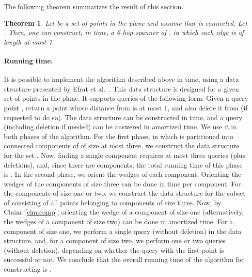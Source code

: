\documentclass[11pt]{article}
\newtheorem{theorem}{Theorem}[section]
\newcommand{\old}[1]{{{}}}
\begin{document}
The following theorem summarizes the result of this section. \begin{theorem}
\label{thm:hop-spanner}
Let  be a set of points in the plane and assume that  is connected. Let . Then, one can construct, in  time, a 6-hop-spanner of , in which each edge is of length at most 7.
\end{theorem}


\paragraph{Running time.}
It is possible to implement the algorithm described above in  time, using a data structure presented by Efrat et al.~\cite{EIK01}. This data structure is designed for a given set  of  points in the plane. It supports queries of the following form: Given a query point , return a point  whose distance from  is at most 1, and also delete it from  (if requested to do so). The data structure can be constructed in  time, and a query (including deletion if needed) can be answered in amortized  time. We use it in both phases of the algorithm. For the first phase, in which  is partitioned into connected components of  of size at most three, we construct the data structure for the set . Now, finding a single component requires at most three queries (plus deletions), and, since there are  components, the total running time of this phase is . In the second phase, we orient the wedges of each component. Orienting the wedges of the components of size three can be done in  time per component. For the components of size one or two, we construct the data structure for the subset of  consisting of all points belonging to components of size three. Now, by Claim~\ref{clm:comp}, orienting the wedge of a component of size one (alternatively, the wedges of a component of size two) can be done in amortized  time. For a component of size one, we perform a single query (without deletion) in the data structure, and, for a component of size two, we perform one or two queries (without deletion), depending on whether the query with the first point is successful or not.  
We conclude that the overall running time of the algorithm for constructing  is .



\old{
\paragraph{Remark.} If our goal is solely to limit one of the measures (i.e., either range or hop distance), then better constants can be easily obtained. E.g., a -hop spanner or an -graph with maximum length .
}
\end{document}
